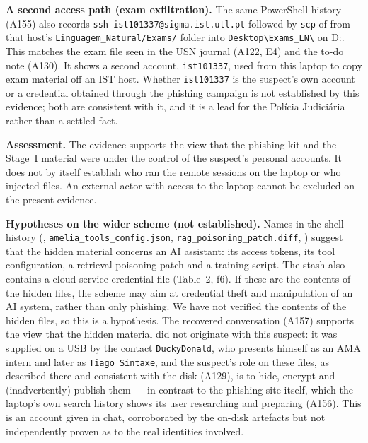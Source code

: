\documentclass[11pt,a4paper,final,oneside]{article}
\begin{document}
\textbf{A second access path (exam exfiltration).} The same PowerShell history (A155) also records \texttt{ssh ist101337@sigma.ist.utl.pt} followed by \texttt{scp} of \texttt{} from that host's \texttt{Linguagem\_Natural/Exams/} folder into \texttt{Desktop\textbackslash{}Exams\_LN\textbackslash{}} on D:. This matches the exam file seen in the USN journal (A122, E4) and the to-do note (A130). It shows a second account, \texttt{ist101337}, used from this laptop to copy exam material off an IST host. Whether \texttt{ist101337} is the suspect's own account or a credential obtained through the phishing campaign is not established by this evidence; both are consistent with it, and it is a lead for the Polícia Judiciária rather than a settled fact.

\textbf{Assessment.} The evidence supports the view that the phishing kit and the Stage~I material were under the control of the suspect's personal accounts. It does not by itself establish who ran the remote sessions on the laptop or who injected files. An external actor with access to the laptop cannot be excluded on the present evidence.

\textbf{Hypotheses on the wider scheme (not established).} Names in the shell history (\texttt{}, \texttt{amelia\_tools\_config.json}, \texttt{rag\_poisoning\_patch.diff}, \texttt{}) suggest that the hidden material concerns an AI assistant: its access tokens, its tool configuration, a retrieval-poisoning patch and a training script. The stash also contains a cloud service credential file (Table~2, f6). If these are the contents of the hidden files, the scheme may aim at credential theft and manipulation of an AI system, rather than only phishing. We have not verified the contents of the hidden files, so this is a hypothesis. The recovered conversation (A157) supports the view that the hidden material did not originate with this suspect: it was supplied on a USB by the contact \texttt{DuckyDonald}, who presents himself as an AMA intern and later as \texttt{Tiago Sintaxe}, and the suspect's role on these files, as described there and consistent with the disk (A129), is to hide, encrypt and (inadvertently) publish them --- in contrast to the phishing site itself, which the laptop's own search history shows its user researching and preparing (A156). This is an account given in chat, corroborated by the on-disk artefacts but not independently proven as to the real identities involved.
\end{document}
